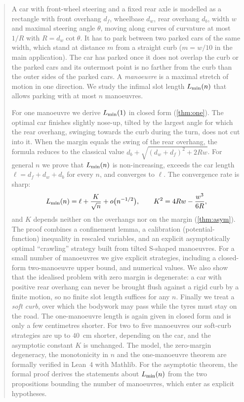 \begin{abstract}
A car with front-wheel steering and a fixed rear axle is modelled as a rectangle with front overhang $d_f$, wheelbase $d_w$, rear overhang $d_b$, width $w$ and maximal steering angle $\theta$, moving along curves of curvature at most $1/R$ with $R=d_w\cot\theta$.
It has to park between two parked cars of the same width, which stand at distance $m$ from a straight curb ($m=w/10$ in the main application).
The car has parked once it does not overlap the curb or the parked cars and its outermost point is no farther from the curb than the outer sides of the parked cars.
A \emph{manoeuvre} is a maximal stretch of motion in one direction.
We study the infimal slot length $\Lmin(n)$ that allows parking with at most $n$ manoeuvres.

For one manoeuvre we derive $\Lmin(1)$ in closed form (\cref{thm:one}).
The optimal car finishes slightly nose-up, tilted by the largest angle for which the rear overhang, swinging towards the curb during the turn, does not cut into it.
When the margin equals the swing of the rear overhang, the formula reduces to the classical value $d_b+\sqrt{(d_w+d_f)^2+2Rw}$.
For general $n$ we prove that $\Lmin(n)$ is non-increasing, exceeds the car length $\ell=d_f+d_w+d_b$ for every $n$, and converges to $\ell$.
The convergence rate is sharp:
\[
  \Lmin(n)=\ell+\frac{K}{\sqrt n}+o\big(n^{-1/2}\big),\qquad K^2=4Rw-\frac{w^3}{6R},
\]
and $K$ depends neither on the overhangs nor on the margin (\cref{thm:asym}).
The proof combines a confinement lemma, a calibration (potential-function) inequality in rescaled variables, and an explicit asymptotically optimal ``crawling'' strategy built from tilted S-shaped manoeuvres.
For a small number of manoeuvres we give explicit strategies, including a closed-form two-manoeuvre upper bound, and numerical values.
We also show that the idealised problem with zero margin is degenerate: a car with positive rear overhang can never be brought flush against a rigid curb by a finite motion, so no finite slot length suffices for any $n$.
Finally we treat a \emph{soft curb}, over which the bodywork may pass while the tyres must stay on the road.
The one-manoeuvre length is again given in closed form and is only a few centimetres shorter. For two to five manoeuvres our soft-curb strategies are up to $40$~cm shorter, depending on the car, and the asymptotic constant $K$ is unchanged.
The model, the zero-margin degeneracy, the monotonicity in $n$ and the one-manoeuvre theorem are formally verified in Lean~4 with Mathlib. For the asymptotic theorem, the formal proof derives the statements about $\Lmin(n)$ from the two propositions bounding the number of manoeuvres, which enter as explicit hypotheses.
\end{abstract}
